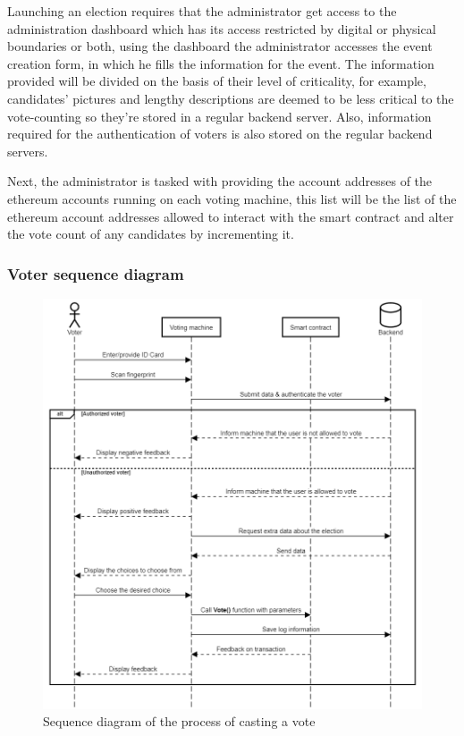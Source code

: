 Launching an election requires that the administrator get access to the administration dashboard which has its access restricted by digital or physical boundaries or both, using the dashboard the administrator accesses the event creation form, in which he fills the information for the event. The information provided will be divided on the basis of their level of criticality, for example, candidates' pictures and lengthy descriptions are deemed to be less critical to the vote-counting so they're stored in a regular backend server. Also, information required for the authentication of voters is also stored on the regular backend servers.

Next, the administrator is tasked with providing the account addresses of the ethereum accounts running on each voting machine, this list will be the list of the ethereum account addresses allowed to interact with the smart contract and alter the vote count of any candidates by incrementing it.

\subsubsection{Voter sequence diagram}

\begin{figure}[H]
	\centering
		\includegraphics[width=14cm]{images/chapter3/voter_sequence_diagram.png}
		\caption{{\footnotesize Sequence diagram of the process of casting a vote}}
\end{figure}

